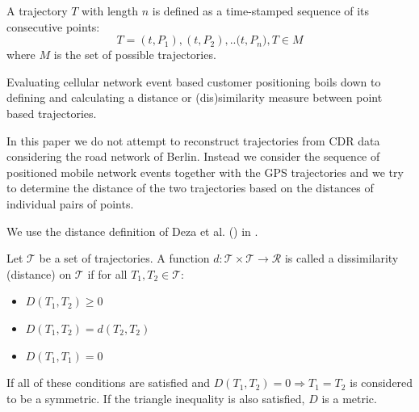 \begin{definition}
A trajectory $T$ with length $n$ is defined as a time-stamped sequence of its consecutive points: \[T={(t,P_{1}), (t,P_{2}), .. (t,P_{n}}), T \in M\]
where $M$ is the set of possible trajectories.
\end{definition}

Evaluating cellular network event based customer positioning boils down to defining and calculating a distance or (dis)similarity measure between point based trajectories.

In this paper we do not attempt to reconstruct trajectories from CDR data considering the road network of Berlin. Instead we consider the sequence of positioned mobile network events together with the GPS trajectories and we try to determine the distance of the two trajectories based on the distances of individual pairs of points.

We use the distance definition of Deza et al. (\cite{encyclopedia}) in \cite{distance-def}. 

\begin{definition}
Let $\mathcal{T}$ be a set of trajectories. A function $d :\mathcal{T} \times \mathcal{T} \rightarrow \mathcal{R}$ is called a dissimilarity (distance) on $\mathcal{T}$ if for all $T_{1}, T_{2} \in \mathcal{T}$: 
\begin{itemize}
    \item $D(T_{1},T_{2}) \geqslant 0$
    \item $D(T_{1},T_{2}) = d(T_{2},T_{2})$
    \item $D(T_{1},T_{1}) = 0$
\end{itemize}
If all of these conditions are satisfied and $D(T_{1}, T_{2}) = 0 \Rightarrow  T_{1} = T_{2} $ is considered to be a symmetric. If
the triangle inequality is also satisfied, $D$ is a metric.
\end{definition}





